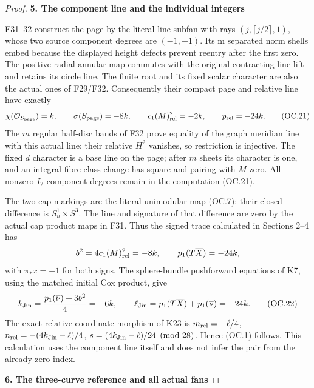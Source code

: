 \begin{proof}
\par

\medskip\noindent\textbf{5. The component line and the individual integers}

\par\nobreak

F31--32 construct the page by the literal line subfan with rays
\((j,\lceil j/2\rceil,1)\), whose two source component degrees are \((-1,+1)\).
Its m separated norm shells embed because the displayed height
defects prevent reentry after the first zero. The positive radial
annular map commutes with the original contracting line lift and
retains its circle line. The finite root and its fixed scalar
character are also the actual ones of F29/F32. Consequently their
compact page and relative line have exactly
\[
 \chi(\mathcal O_{S_{\rm page}})=k,\qquad
 \sigma(S_{\rm page})=-8k,\qquad
 c_1(M)_{\rm rel}^2=-2k,
 \qquad p_{\rm rel}=-24k.
 \tag{OC.21}
\]
The \(m\) regular half-disc bands of F32 prove equality of the graph
meridian line with this actual line: their relative \(H^2\) vanishes, so
restriction is injective. The fixed \(d\) character is a base line on
the page; after \(m\) sheets its character is one, and an integral fibre
class change has square and pairing with \(M\) zero. All nonzero \(I_2\)
component degrees remain in the computation (OC.21).

The two cap markings are the literal unimodular map (OC.7); their
closed difference is \(S^1_u\times S^3\). The line and signature of that
difference are zero by the actual cap product maps in F31. Thus
the signed trace calculated in Sections 2--4 has
\[
 b^2=4c_1(M)_{\rm rel}^2=-8k,\qquad
 p_1(T\overline X)=-24k,
\]
with \(\pi_*x=+1\) for both signs. The sphere-bundle pushforward equations
of K7, using the matched initial Cox product, give
\[
 k_{\rm Jin}=\frac{p_1(\overline\nu)+3b^2}{4}=-6k,
 \qquad
 \ell_{\rm Jin}=p_1(T\overline X)+p_1(\overline\nu)=-24k.
 \tag{OC.22}
\]
The exact relative coordinate morphism of K23 is
\(m_{\rm rel}=-\ell/4\), \(n_{\rm rel}=-(4k_{\rm Jin}-\ell)/4\),
\(s=(4k_{\rm Jin}-\ell)/24\pmod{28}\). Hence (OC.1) follows. This calculation
uses the component line itself and does not infer the pair from the
already zero index.

\par

\medskip\noindent\textbf{6. The three-curve reference and all actual fans}

\par\nobreak


\end{proof}
